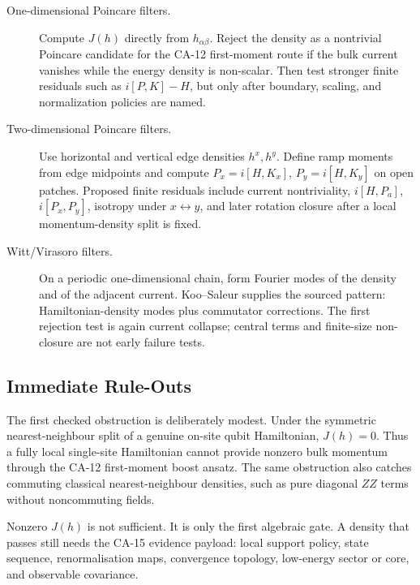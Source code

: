 \begin{description}
\item[One-dimensional Poincare filters.]
Compute \(J(h)\) directly from \(h_{\alpha\beta}\).  Reject the density as a
nontrivial Poincare candidate for the CA-12 first-moment route if the bulk
current vanishes while the energy density is non-scalar.  Then test stronger
finite residuals such as \(i[P,K]-H\), but only after boundary, scaling, and
normalization policies are named.

\item[Two-dimensional Poincare filters.]
Use horizontal and vertical edge densities \(h^x,h^y\).  Define ramp moments
from edge midpoints and compute \(P_x=i[H,K_x]\), \(P_y=i[H,K_y]\) on open
patches.  Proposed finite residuals include current nontriviality,
\(i[H,P_a]\), \(i[P_x,P_y]\), isotropy under \(x\leftrightarrow y\), and later
rotation closure after a local momentum-density split is fixed.

\item[Witt/Virasoro filters.]
On a periodic one-dimensional chain, form Fourier modes of the density and of
the adjacent current.  Koo--Saleur supplies the sourced pattern:
Hamiltonian-density modes plus commutator corrections.  The first rejection
test is again current collapse; central terms and finite-size non-closure are
not early failure tests.
\end{description}

\subsection{Immediate Rule-Outs}

The first checked obstruction is deliberately modest.  Under the symmetric
nearest-neighbour split of a genuine on-site qubit Hamiltonian, \(J(h)=0\).
Thus a fully local single-site Hamiltonian cannot provide nonzero bulk momentum
through the CA-12 first-moment boost ansatz.  The same obstruction also catches
commuting classical nearest-neighbour densities, such as pure diagonal \(ZZ\)
terms without noncommuting fields.

Nonzero \(J(h)\) is not sufficient.  It is only the first algebraic gate.  A
density that passes still needs the CA-15 evidence payload: local support
policy, state sequence, renormalisation maps, convergence topology, low-energy
sector or core, and observable covariance.

